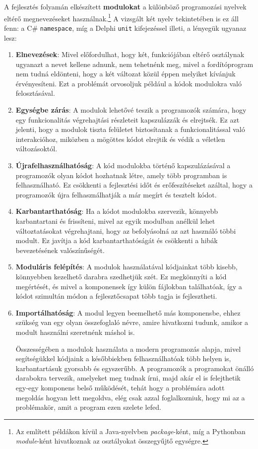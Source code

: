 \documentclass[tocnopagenum]{thesis-ekf}
\begin{document}
	A fejlesztés folyamán elkészített \textbf{modulokat} a különböző programozási nyelvek eltérő megnevezéseket használnak.\footnote{Az említett példákon kívül a Java-nyelvben \textit{package}-ként, míg a Pythonban \textit{module}-ként hivatkoznak az osztályokat összegyűjtő egységre.} A vizsgált két nyelv tekintetében is ez áll fenn: a C\# \verb|namespace|, míg a Delphi \verb|unit| kifejezéssel illeti, a lényegük ugyanaz lesz: 
	\begin{enumerate}
		\item \textbf{Elnevezések}: Mivel előfordulhat, hogy két, funkciójában eltérő osztálynak ugyanazt a nevet kellene adnunk, nem tehetnénk meg, mivel a fordítóprogram nem tudná eldönteni, hogy a két változat közül éppen melyiket kívánjuk érvényesíteni. Ezt a problémát orvosoljuk például a kódok modulokra való felosztásával.
		
		\item \textbf{Egységbe zárás}: A modulok lehetővé teszik a programozók számára, hogy egy funkcionalitás végrehajtási részleteit kapszulázzák és elrejtsék. Ez azt jelenti, hogy a modulok tiszta felületet biztosítanak a funkcionalitással való interakcióhoz, miközben a mögöttes kódot elrejtik és védik a véletlen változásoktól.
		
		\item \textbf{Újrafelhasználhatóság}: A kód modulokba történő kapszulázásával a programozók olyan kódot hozhatnak létre, amely több programban is felhasználható. Ez csökkenti a fejlesztési időt és erőfeszítéseket azáltal, hogy a programozók újra felhasználhatják a már megírt és tesztelt kódot.
		
		\item \textbf{Karbantarthatóság}: Ha a kódot modulokba szervezik, könnyebb karbantartani és frissíteni, mivel az egyik modulban anélkül lehet változtatásokat végrehajtani, hogy az befolyásolná az azt használó többi modult. Ez javítja a kód karbantarthatóságát és csökkenti a hibák bevezetésének valószínűségét.
		
		\item \textbf{Moduláris felépítés}: A modulok használatával kódjainkat több kisebb, könnyebben kezelhető darabra szedhetjük szét. Ez megkönnyíti a kód megértését, és mivel a komponensek így külön fájlokban találhatóak, így a kódot szimultán módon a fejlesztőcsapat több tagja is fejlesztheti.
		
		\item \textbf{Importálhatóság}: A modul legyen beemelhető más komponensbe, ehhez szükség van egy olyan összefoglaló névre, amire hivatkozni tudunk, amikor a modult használni szeretnénk máshol is.
		
		Összességében a modulok használata a modern programozás alapja, mivel segítségükkel kódjaink a későbbiekben felhasználhatóak több helyen is, karbantartásuk gyorsabb és egyszerűbb. A programozók a programokat önálló darabokra tervezik, amelyeket meg tudnak írni, majd akár el is felejthetik egy-egy komponens belső működését, tehát hogy a problémára adott megoldás hogyan lett megoldva, elég csak azzal foglalkozniuk, hogy mi az a problémakör, amit a program ezen szelete lefed. \cite{delphi_basics}
	\end{enumerate}
	
\end{document}
